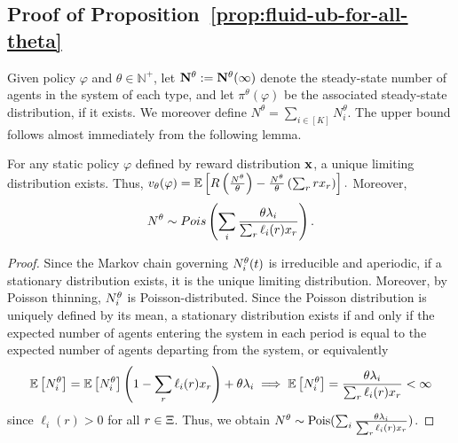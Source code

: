 \documentclass[12pt]{article}
\begin{document}

{\subsection{Proof of Proposition~\ref{prop:fluid-ub-for-all-theta}}

Given policy $\varphi$ and $\theta \in \mathbb{N}^+$, let ${\mathbf{N}}^\theta:={\mathbf{N}}^\theta(\infty)$ denote the steady-state number of agents in the system of each type, and let $\pi^\theta(\varphi)$ be the associated steady-state distribution, if it exists. We moreover define $N^\theta = \sum_{i\in[K]} N^\theta_i$. The upper bound follows almost immediately from the following lemma.


\begin{lemma}\label{prop:limiting-dist}
For any static policy $\varphi$ defined by reward distribution $\mathbf{x}$, a unique limiting distribution exists. Thus, $v_\theta(\varphi) = \mathbb{E}\left[R\left(\frac{N^\theta}{\theta}\right) - \frac{N^\theta}{\theta}\left(\sum_r r x_r \right)\right].$ Moreover,
$$N^\theta \sim\normalfont{Pois}\left(\sum_i\frac{\theta\lambda_i}{\sum_r \ell_i(r)x_r}\right).$$
\end{lemma}

\begin{proof}
Since the Markov chain governing $N^\theta_i(t)$ is irreducible and aperiodic, if a stationary distribution exists, it is the unique limiting distribution. Moreover, by Poisson thinning, $N^\theta_i$ is Poisson-distributed.
Since the Poisson distribution is uniquely defined by its mean, a stationary distribution exists if and only if the expected number of agents entering the system in each period is equal to the expected number of agents departing from the system, or equivalently 
\begin{align*}
\mathbb{E}\left[N^\theta_i\right] = \mathbb{E}\left[N^\theta_i\right]\left(1-\sum_r \ell_i(r)x_r\right) + \theta\lambda_i
\implies \mathbb{E}\left[N^\theta_i\right] = \frac{\theta\lambda_i}{\sum_r \ell_i(r)x_r} < \infty
\end{align*}
since $\ell_i(r) > 0$ for all $r \in \Xi$.
Thus, we obtain $N^\theta\sim\text{Pois}(\sum_i\frac{\theta\lambda_i}{\sum_r \ell_i(r) x_r})$. 


\end{proof}}
\end{document}
